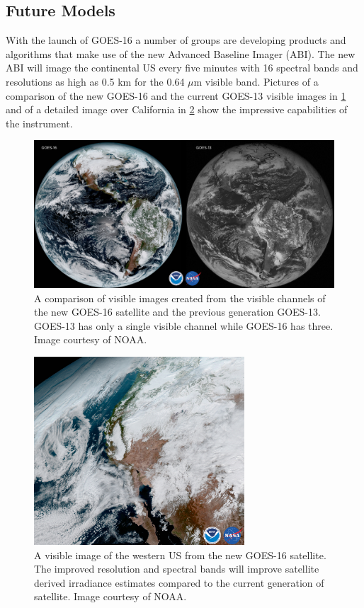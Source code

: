 \subsection{Future Models}
With the launch of GOES-16 a number of groups are developing products
and algorithms that make use of the new Advanced Baseline Imager
(ABI).
The new ABI will image the continental US every five minutes with 16
spectral bands and resolutions as high as 0.5 km for the 0.64 $\mu$m
visible band.
Pictures of a comparison of the new GOES-16 and the current GOES-13
visible images in \cref{fig:goes_comp} and of a detailed image over
California in \cref{fig:goes_cal} show the impressive capabilities of
the instrument.

\begin{figure}[h]
\centering
\includegraphics[width=\textwidth]{figs/goes_comp.jpg}
\caption[Comparison of visible images from the current and future
GOES]{A comparison of visible images created from the visible channels
of the new GOES-16 satellite and the previous generation
GOES-13. GOES-13 has only a single visible channel while GOES-16 has
three. Image courtesy of NOAA.}
\label{fig:goes_comp}
\end{figure}

\begin{figure}[h]
\centering
\includegraphics[width=0.7\textwidth]{figs/goes_cal.jpg}
\caption[An visible image of the western US from GOES-16]{A visible
image of the western US from the new GOES-16 satellite. The improved
resolution and spectral bands will improve satellite derived
irradiance estimates compared to the current generation of
satellite. Image courtesy of NOAA.}
\label{fig:goes_cal}
\end{figure}

